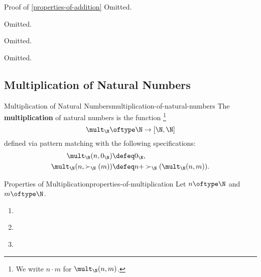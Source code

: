 \begin{Proof}{Proof of \cref{properties-of-addition}}%
    Omitted.

    Omitted.

    Omitted.

    Omitted.
\end{Proof}
\subsection{Multiplication of Natural Numbers}\label{subsection-martin-löf-type-theory-multiplication-of-natural-numbers}
\begin{definition}{Multiplication of Natural Numbers}{multiplication-of-natural-numbers}%
    The \textbf{multiplication} of natural numbers is the function%
    \footnote{%
        We write $n\cdot m$ for $\mult_{\N}(n,m)$.
        \par\vspace*{\TCBBoxCorrection}
    }%
    \[
        \mult_{\N}%
        \oftype%
        \N%
        \to%
        [\N,\N]%
    \]%
    defined via pattern matching with the following specifications:%
    \begin{align*}
        \mult_{\N}(n,0_{\N})        &\defeq 0_{\N},\\
        \mult_{\N}(n,\succ_{\N}(m)) &\defeq n+\succ_{\N}(\mult_{\N}(n,m)).%
    \end{align*}
\end{definition}
\begin{proposition}{Properties of Multiplication}{properties-of-multiplication}%
    Let $n\oftype\N$ and $m\oftype\N$.
    \begin{enumerate}
        \item\label{properties-of-multiplication-unitality}
        \item\label{properties-of-multiplication-associativity}
        \item\label{properties-of-multiplication-commutativity}
    \end{enumerate}
\end{proposition}
